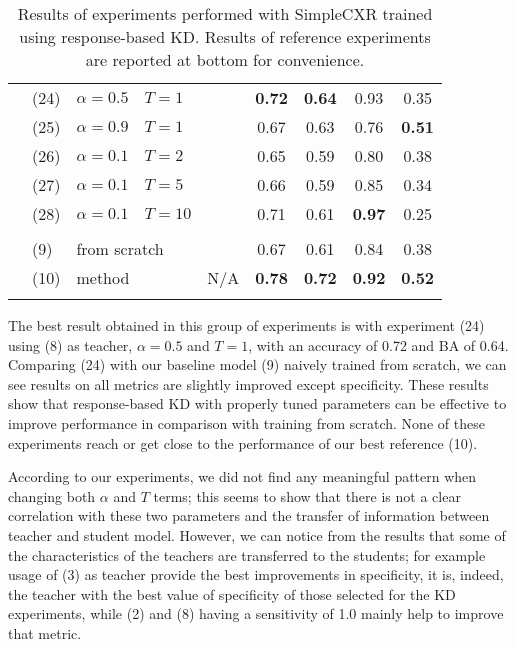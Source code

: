 \begin{table}
\begin{tabular}{c|lll|c|c|c|c|c|}
        & (24) & $\alpha=0.5$ & $T=1$  &                      & \textbf{0.72} & \textbf{0.64} &         0.93  &         0.35  \\
        & (25) & $\alpha=0.9$ & $T=1$  &                      &         0.67  &         0.63  &         0.76  & \textbf{0.51} \\
        & (26) & $\alpha=0.1$ & $T=2$  &                      &         0.65  &         0.59  &         0.80  &         0.38  \\
        & (27) & $\alpha=0.1$ & $T=5$  &                      &         0.66  &         0.59  &         0.85  &         0.34  \\
        & (28) & $\alpha=0.1$ & $T=10$ &                      &         0.71  &         0.61  & \textbf{0.97} &         0.25  \\
        \hhline{~--------}
        \multicolumn{8}{c}{} \\
        \hhline{~--------}
        \multirow{2}{*}{}
        & (9)  & \multicolumn{2}{l|}{from scratch}              &                      \cellcolor{gray!25} &         0.67  &         0.61  &         0.84  &         0.38  \\
        & (10) & \multicolumn{2}{l|}{method \cite{iodice_2022}} & \multirow{-2}{*}{N/A}\cellcolor{gray!25} & \textbf{0.78} & \textbf{0.72} & \textbf{0.92} & \textbf{0.52} \\
        \hhline{~--------}
    \end{tabular}
    \caption{Results of experiments performed with SimpleCXR trained using response-based KD. Results of reference experiments are reported at bottom for convenience.}
    \label{tab:cxr_response_based_kd}
\end{table}

The best result obtained in this group of experiments is with experiment (24) using (8) as teacher, $\alpha=0.5$ and $T=1$, with an accuracy of 0.72 and BA of 0.64.
Comparing (24) with our baseline model (9) naively trained from scratch, we can see results on all metrics are slightly improved except specificity.
These results show that response-based KD with properly tuned parameters can be effective to improve performance in comparison with training from scratch.
None of these experiments reach or get close to the performance of our best reference (10).

According to our experiments, we did not find any meaningful pattern when changing both $\alpha$ and $T$ terms; this seems to show that there is not a clear correlation with these two parameters and the transfer of information between teacher and student model.
However, we can notice from the results that some of the characteristics of the teachers are transferred to the students; for example usage of (3) as teacher provide the best improvements in specificity, it is, indeed, the teacher with the best value of specificity of those selected for the KD experiments, while (2) and (8) having a sensitivity of 1.0 mainly help to improve that metric.

